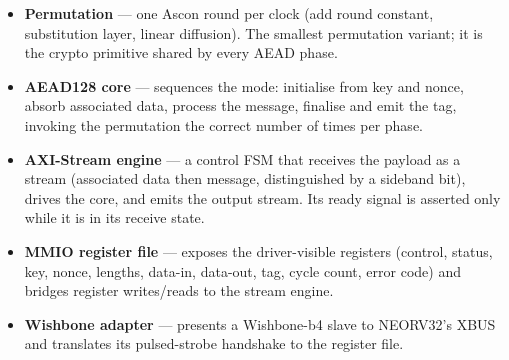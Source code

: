 \documentclass[11pt,a4paper]{article}
\newcommand{\code}[1]{\texttt{\small #1}}
\begin{document}
\begin{center}
\end{center}

\begin{itemize}
\item \textbf{Permutation} --- one Ascon round per clock (add round constant,
      substitution layer, linear diffusion). The smallest permutation variant;
      it is the crypto primitive shared by every AEAD phase.
\item \textbf{AEAD128 core} --- sequences the mode: initialise from key and nonce,
      absorb associated data, process the message, finalise and emit the tag,
      invoking the permutation the correct number of times per phase.
\item \textbf{AXI-Stream engine} --- a control FSM that receives the payload as a
      stream (associated data then message, distinguished by a sideband bit),
      drives the core, and emits the output stream. Its ready signal is asserted
      only while it is in its receive state.
\item \textbf{MMIO register file} --- exposes the driver-visible registers
      (control, status, key, nonce, lengths, data-in, data-out, tag, cycle count,
      error code) and bridges register writes/reads to the stream engine.
\item \textbf{Wishbone adapter} --- presents a Wishbone-b4 slave to NEORV32's
      XBUS and translates its pulsed-strobe handshake to the register file.
\end{itemize}
\end{document}
